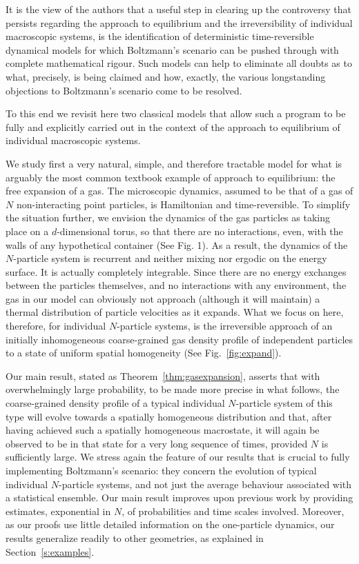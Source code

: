 \documentclass{article}
\numberwithin{equation}{section}
\begin{document}
It is the view of the authors that a useful step in clearing up the controversy that
persists regarding the approach to equilibrium and the irreversibility of individual
macroscopic systems, is the identification of deterministic time-reversible
dynamical models for which Boltzmann's scenario can be
pushed through with complete mathematical rigour. Such models can help
to eliminate all doubts as to what, precisely, is being claimed and how, exactly,
the various longstanding objections to
Boltzmann's scenario come to be resolved.

To this end we
revisit here two classical models that allow such a
program to be fully and explicitly carried out in the context of the approach
to equilibrium of individual macroscopic systems.


We study first a very natural, simple, and therefore tractable model \cite{Fr58, Be10, Be12} for what
is arguably the most common
textbook example of approach to equilibrium: the free expansion
of a gas. The microscopic dynamics, assumed to be that of a gas of $N$ non-interacting point particles,
is Hamiltonian and time-reversible. To simplify the situation further, we envision the
dynamics of the gas particles as taking place on a $d$-dimensional torus, so that there are no
interactions, even, with the walls of any hypothetical container (See Fig. 1). As a result, the dynamics of
the $N$-particle system is recurrent and neither mixing nor ergodic on the energy surface. It is actually completely integrable.
Since there are no energy exchanges between the particles themselves,
and no interactions with any environment, the gas in our model can obviously not approach
(although it will maintain) a thermal distribution of particle velocities as it
expands. What we focus on here, therefore, for individual $N$-particle systems, is
the irreversible approach of an initially inhomogeneous coarse-grained gas density profile of independent particles
to a state of uniform spatial homogeneity (See Fig.~\ref{fig:expand}).

Our main result, stated as
 Theorem~\ref{thm:gasexpansion}, asserts that with overwhelmingly large probability,
to be made more precise in what follows,
the coarse-grained density profile of a typical individual $N$-particle system of this type will evolve towards a spatially homogeneous distribution and that, after having achieved such a spatially homogeneous macrostate, it will again be observed to be in
that state for a very long sequence of times, provided $N$ is sufficiently large.
We stress again the feature of our results that is crucial to fully implementing Boltzmann's scenario: they concern the evolution of typical individual $N$-particle systems, and not just the average behaviour associated with a statistical ensemble.  Our main result improves upon previous work by providing  estimates, exponential in $N$, of probabilities and time scales involved.
Moreover, as our proofs use little detailed information on the one-particle dynamics, our results generalize readily to other geometries, as explained in Section~\ref{s:examples}.
\end{document}
